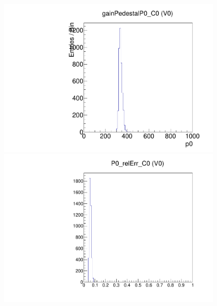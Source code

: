\begin{figure}[!Hp]
\centering
\begin{minipage}{0.45\textwidth}
  \includegraphics[width=1.0\textwidth]{figures/gainped_gainPedestalP0.pdf}
  \caption{}
  \label{fig:gainped_gainPedestalP0}
\end{minipage}
\hspace{0.3cm}
\begin{minipage}{0.45\textwidth}
  \includegraphics[width=1.0\textwidth]{figures/gainped_P0_relErr.pdf}
  \caption{}
  \label{fig:gainped_P0_relErr}
\end{minipage}
\end{figure}

